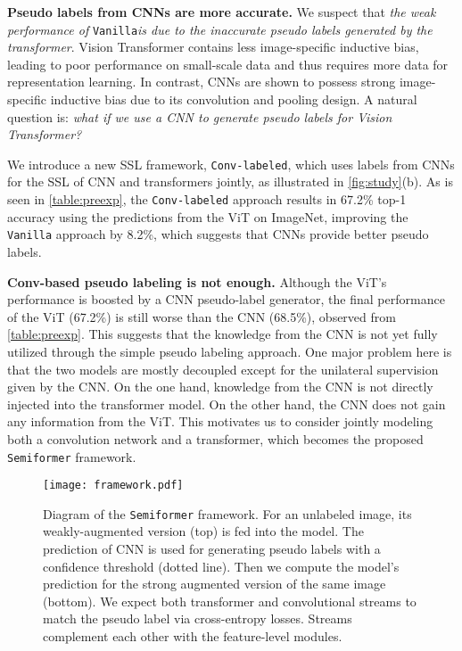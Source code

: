\documentclass[runningheads]{llncs}
\makeatletter
\newcommand{\fakeparagraph}[1]{\textbf{#1}}
\newcommand*{\system}{\texttt{Semiformer}\@\xspace}
\newcommand*{\vanilla}{\texttt{Vanilla}\@\xspace}
\newcommand*{\convl}{\texttt{Conv-labeled}\@\xspace}
\makeatother
\begin{document}
\fakeparagraph{Pseudo labels from CNNs are more accurate.}  We suspect that \emph{the weak performance of} \vanilla \emph{is due to the inaccurate pseudo labels generated by the transformer}. Vision Transformer contains less image-specific inductive bias, leading to poor performance on small-scale data and thus requires more data for representation learning.
In contrast, CNNs are shown to possess strong image-specific inductive bias due to its convolution and pooling design. A natural question is: \emph{what if we use a CNN to generate pseudo labels for Vision Transformer?} 

We introduce a new SSL framework, \convl,  which uses labels from CNNs for the SSL of CNN and transformers jointly, as illustrated in \cref{fig:study}(b). As is seen in \cref{table:preexp}, the \convl approach results in 67.2\% top-1 accuracy using the predictions from the ViT on ImageNet, improving the \vanilla approach by 8.2\%, which suggests that CNNs provide better pseudo labels.


\fakeparagraph{Conv-based pseudo labeling is not enough.} Although the ViT's performance is boosted by a CNN pseudo-label generator, the final performance of the ViT (67.2\%) is still worse than the CNN (68.5\%), observed from \cref{table:preexp}. This suggests that the knowledge from the CNN is not yet fully utilized through the simple pseudo labeling approach. 
One major problem here is that the two models are mostly decoupled except for the unilateral supervision given by the CNN. On the one hand, knowledge from the CNN is not directly injected into the transformer model. On the other hand, the CNN does not gain any information from the ViT.
This motivates us to consider jointly modeling both a convolution network and a transformer, which becomes the proposed \system framework.


\begin{figure}[t!]
\centering
\texttt{[image: framework.pdf]}
  \caption{Diagram of the \system framework. For an unlabeled image, its weakly-augmented version (top) is fed into the model. The prediction of CNN is used for generating pseudo labels with a confidence threshold (dotted line). Then we compute the model's prediction for the strong augmented version of the same image (bottom). We expect both transformer and convolutional streams to match the pseudo label via cross-entropy losses. Streams complement each other with the feature-level modules.
  }
\label{fig:framework}
\end{figure}
\end{document}
